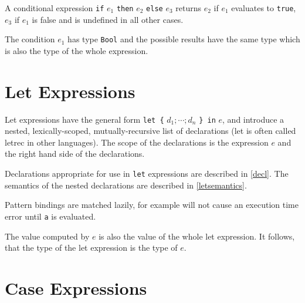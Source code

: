 A conditional expression \texttt{if} $e_1$ \texttt{then} $e_2$ \texttt{else} $e_3$ returns $e_2$ if $e_1$ evaluates to \texttt{true}, $e_3$ if $e_1$ is false and is undefined in all other cases.

The condition $e_1$ has type \texttt{Bool} and the possible results have the same type which is also the type of the whole expression.

\section{Let Expressions}  \label{letexpr}

\begin{flushleft}
  \bracea{}  \bracez{}  
\end{flushleft}

Let expressions have the general form
\texttt{let \{} $d_1 ; \cdots{} ; d_n$  \texttt{\} in} $e$,
and introduce a nested,
lexically-scoped, mutually-recursive list of declarations
(let is often called letrec in other languages).
The scope of the declarations is the expression $e$ and the right hand side of the declarations.

Declarations appropriate for use in \texttt{let} expressions are described in \autoref{decl}. The semantics of the nested declarations are described in \autoref{letsemantics}.

Pattern bindings are matched lazily, for example  will not cause an execution time error until \texttt{a} is evaluated.

The value computed by $e$ is also the value of the whole let expression. It follows, that the type of the let expression is the type of $e$.

\section{Case Expressions} \label{caseex} 

\begin{flushleft}
     \bracea{}  \bracez{}\\
  \sym{->} 
  \alt {} 
  \alt {}  \bracea{}  \bracez{}\\
 \\
 \sym{$|$}  \sym{=} 
\end{flushleft}

